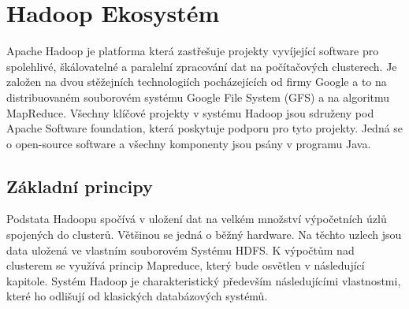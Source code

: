 \documentclass[thesis=M,czech]{FITthesis}[2012/06/26]
\begin{document}
\section{Hadoop Ekosystém}
Apache Hadoop je platforma která zastřešuje projekty vyvíjející software pro spolehlivé, škálovatelné a paralelní zpracování dat na počítačových clusterech. Je založen na dvou stěžejních  technologiích pocházejících od firmy Google  a to na distribuovaném souborovém systému Google File System (GFS)\cite{GFS} a na algoritmu MapReduce\cite{HadoopDum}. Všechny klíčové projekty v systému Hadoop jsou sdruženy pod Apache Software foundation, která poskytuje podporu pro tyto projekty. Jedná se o open-source software a všechny komponenty jsou psány v programu Java.

\subsection{Základní principy}
Podstata Hadoopu spočívá v uložení dat na velkém množství výpočetních úzlů spojených do clusterů. Většinou se jedná o běžný hardware. Na těchto uzlech jsou data uložená ve vlastním souborovém Systému HDFS. K výpočtům nad clusterem se využívá princip Mapreduce, který bude osvětlen v následující kapitole. Systém Hadoop je charakteristický především následujícími vlastnostmi, které ho odlišují od klasických databázových systémů.
\end{document}
